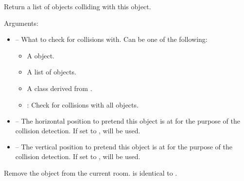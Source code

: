 \documentclass[letterpaper,10pt,english]{sphinxmanual}
\begin{document}
\begin{fulllineitems}
\label{dsp:sge.dsp.Object.collision}
Return a list of objects colliding with this object.

Arguments:
\begin{itemize}
\item {} 
 -- What to check for collisions with.  Can be one of
the following:
\begin{itemize}
\item {} 
A {\hyperref[dsp:sge.dsp.Object]{\emph{}}} object.

\item {} 
A list of {\hyperref[dsp:sge.dsp.Object]{\emph{}}} objects.

\item {} 
A class derived from {\hyperref[dsp:sge.dsp.Object]{\emph{}}}.

\item {} 
: Check for collisions with all objects.

\end{itemize}

\item {} 
 -- The horizontal position to pretend this object is at
for the purpose of the collision detection.  If set to
, {\hyperref[dsp:sge.dsp.Object.x]{\emph{}}} will be used.

\item {} 
 -- The vertical position to pretend this object is at
for the purpose of the collision detection.  If set to
, {\hyperref[dsp:sge.dsp.Object.y]{\emph{}}} will be used.

\end{itemize}

\end{fulllineitems}


\begin{fulllineitems}
\label{dsp:sge.dsp.Object.destroy}
Remove the object from the current room.   is
identical to .

\end{fulllineitems}
\end{document}
